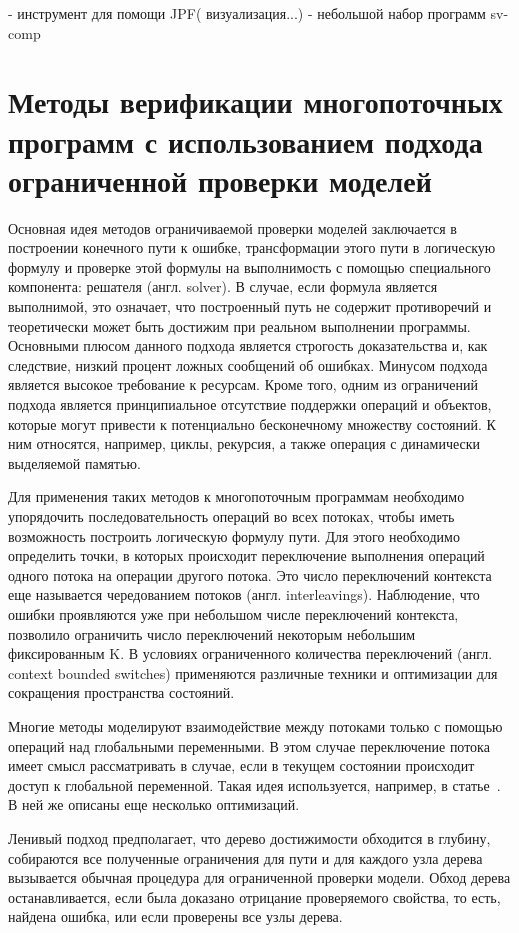 \cite{Wesonga:2011} - инструмент для помощи JPF( визуализация...)
\cite{Dourado:2016} - небольшой набор программ
sv-comp

\section{Методы верификации многопоточных программ с использованием подхода ограниченной проверки моделей}
\label{rw:bmc}

Основная идея методов ограничиваемой проверки моделей заключается в построении конечного пути к ошибке, трансформации этого пути в логическую формулу и проверке этой формулы на выполнимость с помощью специального компонента: решателя (англ. solver). В случае, если формула является выполнимой, это означает, что построенный путь не содержит противоречий и теоретически может быть достижим при реальном выполнении программы.
Основными плюсом данного подхода является строгость доказательства и, как следствие, низкий процент ложных сообщений об ошибках.
Минусом подхода является высокое требование к ресурсам. Кроме того, одним из ограничений подхода является принципиальное отсутствие поддержки операций и объектов, которые могут привести к потенциально бесконечному множеству состояний. К ним относятся, например, циклы, рекурсия, а также операция с динамически выделяемой памятью. 

Для применения таких методов к многопоточным программам необходимо упорядочить последовательность операций во всех потоках, чтобы иметь возможность построить логическую формулу пути. Для этого необходимо определить точки, в которых происходит переключение выполнения операций одного потока на операции другого потока. Это число переключений контекста еще называется чередованием потоков (англ. interleavings). Наблюдение, что ошибки проявляются уже при небольшом числе переключений контекста, позволило ограничить число переключений некоторым небольшим фиксированным K. В условиях ограниченного количества переключений (англ. context bounded switches) применяются различные техники и оптимизации для сокращения пространства состояний. 

Многие методы моделируют взаимодействие между потоками только с помощью операций над глобальными переменными. В этом случае переключение потока имеет смысл рассматривать в случае, если в текущем состоянии происходит доступ к глобальной переменной. Такая идея используется, например, в статье~\cite{Cordeiro:2011}. В ней же описаны еще несколько оптимизаций.

Ленивый подход предполагает, что дерево достижимости обходится в глубину, собираются все полученные ограничения для пути и для каждого узла дерева вызывается обычная процедура для ограниченной проверки модели. Обход дерева останавливается, если была доказано отрицание проверяемого свойства, то есть, найдена ошибка, или если проверены все узлы дерева.

